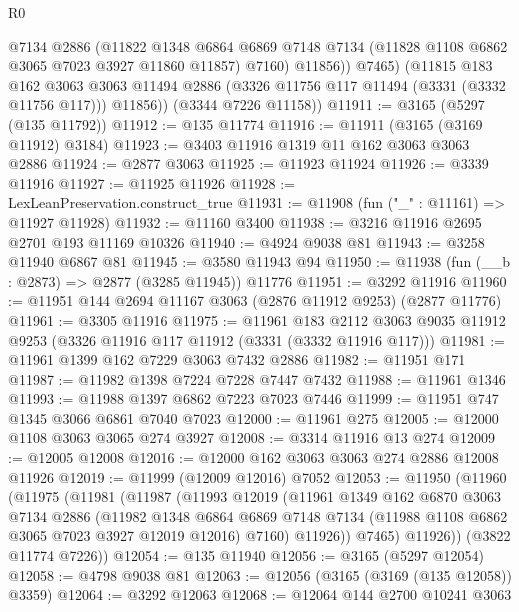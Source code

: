 \begin{lexlean}{R0}
\begin{coremodule}
              @7134
              @2886
              (@11822
                @1348
                @6864
                @6869
                @7148
                @7134
                (@11828 @1108 @6862 @3065 @7023 @3927 @11860 @11857)
                @7160)
              @11856))
          @7465)
        (@11815
          @183
          @162
          @3063
          @3063
          @11494
          @2886
          (@3326 @11756 @117 @11494 (@3331 (@3332 @11756 @117)))
          @11856))
      (@3344 @7226 @11158))
@11911 := @3165 (@5297 (@135 @11792))
@11912 := @135 @11774
@11916 := @11911 (@3165 (@3169 @11912) @3184)
@11923 := @3403 @11916 @1319 @11 @162 @3063 @3063 @2886
@11924 := @2877 @3063
@11925 := @11923 @11924
@11926 := @3339 @11916
@11927 := @11925 @11926
@11928 := LexLeanPreservation.construct_true
@11931 := @11908 (fun ("_" : @11161) => @11927 @11928)
@11932 := @11160 @3400
@11938 := @3216 @11916 @2695 @2701 @193 @11169 @10326
@11940 := @4924 @9038 @81
@11943 := @3258 @11940 @6867 @81
@11945 := @3580 @11943 @94
@11950 := @11938 (fun (__b : @2873) => @2877 (@3285 @11945)) @11776
@11951 := @3292 @11916
@11960 := @11951 @144 @2694 @11167 @3063 (@2876 @11912 @9253) (@2877 @11776)
@11961 := @3305 @11916
@11975 := @11961
    @183
    @2112
    @3063
    @9035
    @11912
    @9253
    (@3326 @11916 @117 @11912 (@3331 (@3332 @11916 @117)))
@11981 := @11961 @1399 @162 @7229 @3063 @7432 @2886
@11982 := @11951 @171
@11987 := @11982 @1398 @7224 @7228 @7447 @7432
@11988 := @11961 @1346
@11993 := @11988 @1397 @6862 @7223 @7023 @7446
@11999 := @11951 @747 @1345 @3066 @6861 @7040 @7023
@12000 := @11961 @275
@12005 := @12000 @1108 @3063 @3065 @274 @3927
@12008 := @3314 @11916 @13 @274
@12009 := @12005 @12008
@12016 := @12000 @162 @3063 @3063 @274 @2886 @12008 @11926
@12019 := @11999 (@12009 @12016) @7052
@12053 := @11950
    (@11960
      (@11975
        (@11981
          (@11987
            (@11993
              @12019
              (@11961
                @1349
                @162
                @6870
                @3063
                @7134
                @2886
                (@11982
                  @1348
                  @6864
                  @6869
                  @7148
                  @7134
                  (@11988 @1108 @6862 @3065 @7023 @3927 @12019 @12016)
                  @7160)
                @11926))
            @7465)
          @11926))
      (@3822 @11774 @7226))
@12054 := @135 @11940
@12056 := @3165 (@5297 @12054)
@12058 := @4798 @9038 @81
@12063 := @12056 (@3165 (@3169 (@135 @12058)) @3359)
@12064 := @3292 @12063
@12068 := @12064 @144 @2700 @10241 @3063

\end{coremodule}
\end{lexlean}
